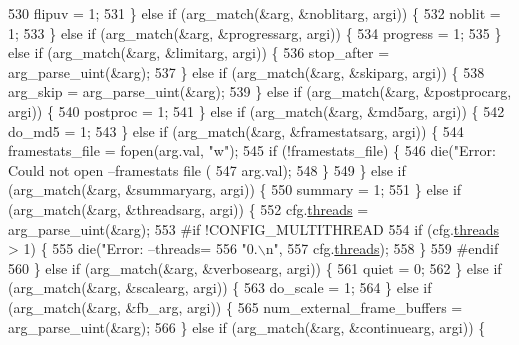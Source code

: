 \begin{DoxyCodeInclude}
{{{{{{{{{{{{{{{{{{{{{{{{{{530       flipuv = 1;
531     \} \textcolor{keywordflow}{else} \textcolor{keywordflow}{if} (arg\_match(&arg, &noblitarg, argi)) \{
532       noblit = 1;
533     \} \textcolor{keywordflow}{else} \textcolor{keywordflow}{if} (arg\_match(&arg, &progressarg, argi)) \{
534       progress = 1;
535     \} \textcolor{keywordflow}{else} \textcolor{keywordflow}{if} (arg\_match(&arg, &limitarg, argi)) \{
536       stop\_after = arg\_parse\_uint(&arg);
537     \} \textcolor{keywordflow}{else} \textcolor{keywordflow}{if} (arg\_match(&arg, &skiparg, argi)) \{
538       arg\_skip = arg\_parse\_uint(&arg);
539     \} \textcolor{keywordflow}{else} \textcolor{keywordflow}{if} (arg\_match(&arg, &postprocarg, argi)) \{
540       postproc = 1;
541     \} \textcolor{keywordflow}{else} \textcolor{keywordflow}{if} (arg\_match(&arg, &md5arg, argi)) \{
542       do\_md5 = 1;
543     \} \textcolor{keywordflow}{else} \textcolor{keywordflow}{if} (arg\_match(&arg, &framestatsarg, argi)) \{
544       framestats\_file = fopen(arg.val, \textcolor{stringliteral}{"w"});
545       \textcolor{keywordflow}{if} (!framestats\_file) \{
546         die(\textcolor{stringliteral}{"Error: Could not open --framestats file (%
547             arg.val);
548       \}
549     \} \textcolor{keywordflow}{else} \textcolor{keywordflow}{if} (arg\_match(&arg, &summaryarg, argi)) \{
550       summary = 1;
551     \} \textcolor{keywordflow}{else} \textcolor{keywordflow}{if} (arg\_match(&arg, &threadsarg, argi)) \{
552       cfg.\hyperlink{structaom__codec__dec__cfg_a48c68337e1071e2aee36c649e579f189}{threads} = arg\_parse\_uint(&arg);
553 \textcolor{preprocessor}{#if !CONFIG\_MULTITHREAD}
554       \textcolor{keywordflow}{if} (cfg.\hyperlink{structaom__codec__dec__cfg_a48c68337e1071e2aee36c649e579f189}{threads} > 1) \{
555         die(\textcolor{stringliteral}{"Error: --threads=%
556             \textcolor{stringliteral}{"0.\(\backslash\)n"},
557             cfg.\hyperlink{structaom__codec__dec__cfg_a48c68337e1071e2aee36c649e579f189}{threads});
558       \}
559 \textcolor{preprocessor}{#endif}
560     \} \textcolor{keywordflow}{else} \textcolor{keywordflow}{if} (arg\_match(&arg, &verbosearg, argi)) \{
561       quiet = 0;
562     \} \textcolor{keywordflow}{else} \textcolor{keywordflow}{if} (arg\_match(&arg, &scalearg, argi)) \{
563       do\_scale = 1;
564     \} \textcolor{keywordflow}{else} \textcolor{keywordflow}{if} (arg\_match(&arg, &fb\_arg, argi)) \{
565       num\_external\_frame\_buffers = arg\_parse\_uint(&arg);
566     \} \textcolor{keywordflow}{else} \textcolor{keywordflow}{if} (arg\_match(&arg, &continuearg, argi)) \{
}}}}}}}}}}}}}}}}}}}}}}}}}}}}
\end{DoxyCodeInclude}
